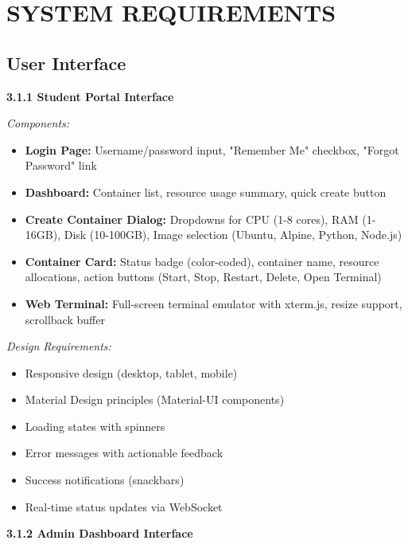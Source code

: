 \documentclass[12pt,a4paper]{article}
\begin{document}
\section{SYSTEM REQUIREMENTS}

\subsection{User Interface}

\textbf{3.1.1 Student Portal Interface}

\textit{Components:}
\begin{itemize}[noitemsep]
    \item \textbf{Login Page:} Username/password input, "Remember Me" checkbox, "Forgot Password" link
    \item \textbf{Dashboard:} Container list, resource usage summary, quick create button
    \item \textbf{Create Container Dialog:} Dropdowns for CPU (1-8 cores), RAM (1-16GB), Disk (10-100GB), Image selection (Ubuntu, Alpine, Python, Node.js)
    \item \textbf{Container Card:} Status badge (color-coded), container name, resource allocations, action buttons (Start, Stop, Restart, Delete, Open Terminal)
    \item \textbf{Web Terminal:} Full-screen terminal emulator with xterm.js, resize support, scrollback buffer
\end{itemize}

\textit{Design Requirements:}
\begin{itemize}[noitemsep]
    \item Responsive design (desktop, tablet, mobile)
    \item Material Design principles (Material-UI components)
    \item Loading states with spinners
    \item Error messages with actionable feedback
    \item Success notifications (snackbars)
    \item Real-time status updates via WebSocket
\end{itemize}

\textbf{3.1.2 Admin Dashboard Interface}
\end{document}
